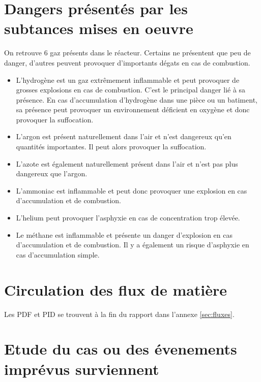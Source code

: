 \section{Dangers présentés par les subtances mises en oeuvre}

On retrouve $6$ gaz présents dans le réacteur. 
Certains ne présentent que peu de danger, 
d'autres peuvent provoquer d'importants dégats en cas de combustion.

\begin{itemize}	
	\item L'hydrogène est un gaz extrêmement inflammable et peut provoquer de grosses 
		explosions en cas de combustion. C'est le principal danger lié à sa présence. 
		En cas d'accumulation d'hydrogène dans une pièce ou un batiment, 
		sa présence peut provoquer un environnement déficient en oxygène et 
		donc provoquer la suffocation.

	\item  L'argon est présent naturellement dans l'air et n'est dangereux qu'en 
		quantités importantes. Il peut alors provoquer la suffocation.

	\item  L'azote est également naturellement présent dans l'air et n'est pas plus 
		dangereux que l'argon.

	\item  L'ammoniac est inflammable et peut donc provoquer une explosion en cas 
		d'accumulation et de combustion.

	\item  L'helium peut provoquer l'asphyxie en cas de concentration trop élevée.

	\item  Le méthane est inflammable et présente un danger d'explosion en cas 
		d'accumulation et de combustion. Il y a également un risque d'asphyxie en 
		cas d'accumulation simple.
\end{itemize}

\section{Circulation des flux de matière}

Les PDF et PID se trouvent à la fin du rapport dans l'annexe \ref{sec:fluxes}.



\section{Etude du cas ou des évenements imprévus surviennent}


